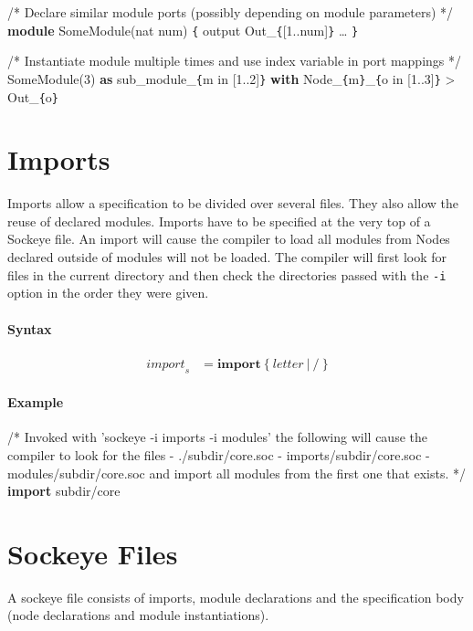 \documentclass[a4paper,11pt,twoside]{report}
\begin{document}
{{{\begin{syntax}
    /* Declare similar module ports
       (possibly depending on module parameters) */
    \textbf{module} SomeModule(nat num) \verb+{+
        output Out_\verb+{+[1..num]\verb+}+
        \ldots
    \verb+}+

    /* Instantiate module multiple times
       and use index variable in port mappings */
    SomeModule(3) \textbf{as} sub_module_\verb+{+m in [1..2]\verb+}+ \textbf{with}
        Node_\verb+{+m\verb+}+_\verb+{+o in [1..3]\verb+}+ > Out_\verb+{+o\verb+}+
\end{syntax}

\section{Imports}
\label{sec:imports}
Imports allow a specification to be divided over several files.
They also allow the reuse of declared modules.
Imports have to be specified at the very top of a Sockeye file.
An import will cause the compiler to load all modules from 
Nodes declared outside of modules will not be loaded.
The compiler will first look for files in the current directory and then check the directories passed with the \texttt{-i} option in the order they were given.

\paragraph{Syntax}
\begin{align*}
\textit{import}_s & \mathop{=}
    \textbf{import}\ \big\{\ \textit{letter}\ |\ \textbf{/}\ \big\}
\end{align*}

\paragraph{Example}
\begin{syntax}
    /* Invoked with 'sockeye -i imports -i modules' the following
       will cause the compiler to look for the files
       - ./subdir/core.soc
       - imports/subdir/core.soc
       - modules/subdir/core.soc
       and import all modules from the first one that exists. */
    \textbf{import} subdir/core
\end{syntax}

\section{Sockeye Files}
A sockeye file consists of imports, module declarations and the specification body (node declarations and module instantiations).

}}}
\end{document}
